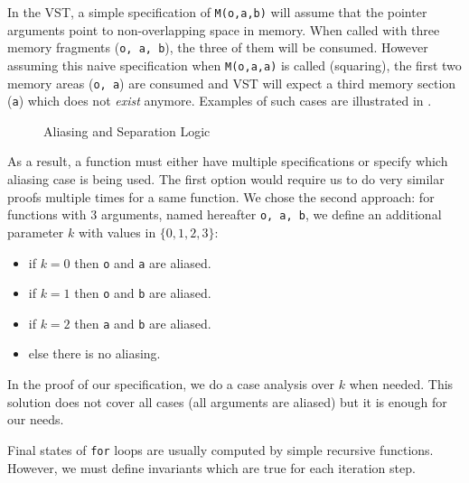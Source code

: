 
In the VST, a simple specification of \texttt{M(o,a,b)} will assume that the pointer arguments
point to non-overlapping space in memory.
When called with three memory fragments (\texttt{o, a, b}),
the three of them will be consumed. However assuming this naive specification
when \texttt{M(o,a,a)} is called (squaring), the first two memory areas (\texttt{o, a})
are consumed and VST will expect a third memory section (\texttt{a}) which does not \emph{exist} anymore.
Examples of such cases are illustrated in .
\begin{figure}[h]%
  \centering%
  \caption{Aliasing and Separation Logic}%
  \label{tikz:MemSame}%
\end{figure}

As a result, a function must either have multiple specifications or specify which
aliasing case is being used.
The first option would require us to do very similar proofs multiple times for a same function.
We chose the second approach: for functions with 3 arguments, named hereafter \texttt{o, a, b},
we define an additional parameter $k$ with values in $\{0,1,2,3\}$:
\begin{itemize}
  \item if $k=0$ then \texttt{o} and \texttt{a} are aliased.
  \item if $k=1$ then \texttt{o} and \texttt{b} are aliased.
  \item if $k=2$ then \texttt{a} and \texttt{b} are aliased.
  \item else there is no aliasing.
\end{itemize}
In the proof of our specification, we do a case analysis over $k$ when needed.
This solution does not cover all cases (\eg all arguments are aliased) but it
is enough for our needs.





Final states of \texttt{for} loops are usually computed by simple recursive functions.
However, we must define invariants which are true for each iteration step.

